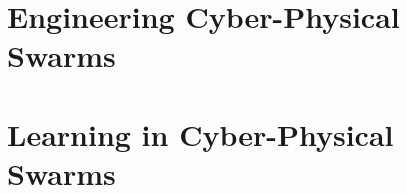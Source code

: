 \documentclass[12pt,a4paper,oneside]{book}
\begin{document}

\part{Engineering Cyber-Physical Swarms}\label{part:engineering}
\begin{refsection}


\printbibliography[title=References,heading=bibintoc]
\end{refsection}
\part{Learning in Cyber-Physical Swarms}\label{part:learning}
\begin{refsection}



\printbibliography[title=References,heading=bibintoc]
\end{refsection}


\adjustmtc

\end{document}

